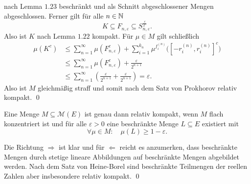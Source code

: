 \begin{proof*}
$$    $$
    nach Lemma $1.23$ beschränkt und als Schnitt abgeschlossener Mengen abgeschlossen. Ferner gilt für alle $n \in \mathbb{N}$
    $$
        K \subseteq  F_{n, \varepsilon} \subseteq S_{n,\varepsilon}^{\frac{\varepsilon}{2^n}}.
    $$
    Also ist $K$ nach Lemma $1.22$ kompakt. Für $\mu \in M$ gilt schließlich
    \begin{align*}
        \mu(K^c) &\leq \sum_{n=1}^{\infty}\mu(F_{n, \varepsilon}^c) + \sum_{i=1}^{k_n}\mu^{f_i^{(n)}}\big([-r_i^{(n)}, r_i^{(n)}]^c\big) \\\
                 &\leq \sum_{n=1}^{\infty}\mu(F_{n, \varepsilon}^c) + \frac{\varepsilon}{2^{n+1}} \\\
                 &\leq \sum_{n=1}^{\infty}(\frac{\varepsilon}{2^{n+1}} + \frac{\varepsilon}{2^{n+1}}) = \varepsilon. 
    \end{align*}
    Also ist $M$ gleichmäßig straff und somit nach dem Satz von Prokhorov relativ kompakt. \qed
\end{proof*}

\begin{corollary}
    Eine Menge $M \subseteq \mathcal{M}(E)$ ist genau dann relativ kompakt, wenn $M$ flach konzentriert ist und für alle $\varepsilon > 0$ eine beschränkte Menge $L \subseteq E$ existiert mit
    $$
        \forall \mu \in M: \quad \mu(L) \geq 1 - \varepsilon. 
    $$
\end{corollary}

\begin{proof*}
    Die Richtung $\Rightarrow$ ist klar und für $\Leftarrow$ reicht es anzumerken, dass beschränkte Mengen durch stetige lineare Abbildungen auf beschränkte Mengen abgebildet werden. Nach dem Satz von Heine-Borel sind 
    beschränkte Teilmengen der reellen Zahlen aber insbesondere relativ kompakt. \qed 
\end{proof*}

